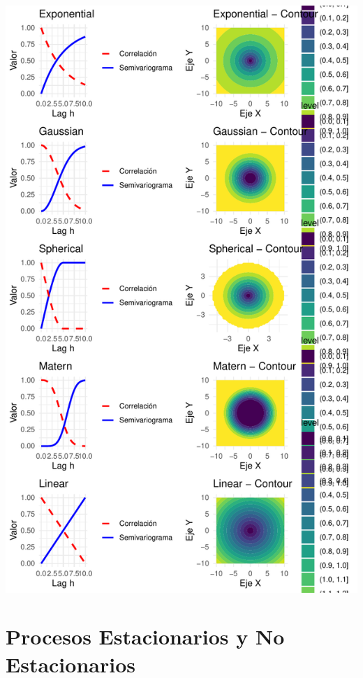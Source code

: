 \documentclass[
  10pt,
  ignorenonframetext,
]{beamer}
\begin{document}
\begin{frame}
\begin{center}\includegraphics{imagenes/unnamed-chunk-4-1} \end{center}
\end{frame}

\section{Procesos Estacionarios y No
Estacionarios}\label{procesos-estacionarios-y-no-estacionarios}
\end{document}
